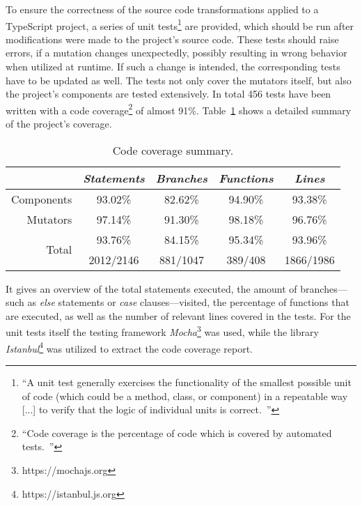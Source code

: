 To ensure the correctness of the source code transformations applied to a TypeScript project, a series of unit tests\footnote{``A unit test generally exercises the functionality of the smallest possible unit of code (which could be a method, class, or component) in a repeatable way~\cite{UnitTests:Android} [...] to verify that the logic of individual units is correct.~\cite{UnitTests:Android}''} are provided, which should be run after modifications were made to the project's source code. These tests should raise errors, if a mutation changes unexpectedly, possibly resulting in wrong behavior when utilized at runtime. If such a change is intended, the corresponding tests have to be updated as well. The tests not only cover the mutators itself, but also the project's components are tested extensively. In total 456 tests have been written with a code coverage\footnote{``Code coverage is the percentage of code which is covered by automated tests.~\cite{CodeCoverage:Atlassian}''} of almost 91\%. Table~\ref{tab:code-coverage} shows a detailed summary of the project's coverage.
\begin{table}
\caption{Code coverage summary.}
\label{tab:code-coverage}
\centering
\setlength{\tabcolsep}{5mm}
\def\arraystretch{1.25}
\small
\begin{tabular}{|r||c|c|c|c|}
    \hline
    & \emph{Statements} & \emph{Branches} & \emph{Functions} & \emph{Lines} \\
    \hline
    \hline
    Components & 93.02\% & 82.62\% & 94.90\% & 93.38\% \\
    \hline
    Mutators & 97.14\% & 91.30\% & 98.18\% & 96.76\% \\
    \hline
    \hline
    \multicolumn{1}{|r||}{\multirow{2}{*}{Total}} & 93.76\% & 84.15\% & 95.34\% & 93.96\% \\
    \cline{2-5}
    \multicolumn{1}{|c||}{} & 2012/2146 & 881/1047 & 389/408 & 1866/1986 \\
    \hline
  \end{tabular}
\end{table}
It gives an overview of the total statements executed, the amount of branches---such as \emph{else} statements or \emph{case} clauses---visited, the percentage of functions that are executed, as well as the number of relevant lines covered in the tests. For the unit tests itself the testing framework \emph{Mocha}\footnote{https://mochajs.org} was used, while the library \emph{Istanbul}\footnote{https://istanbul.js.org} was utilized to extract the code coverage report.

